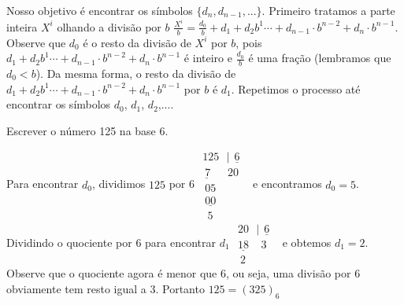 Nosso objetivo é encontrar os símbolos $\{d_n, d_{n-1}, ...\}$. Primeiro tratamos a parte inteira $X^{i}$ olhando a divisão por $b$
$
\frac{X^{i}}{b}=   \frac{d_0}{b}+d_1+d_2 b^1\cdots+d_{n-1}\cdot b^{n-2} +d_n\cdot b^{n-1}.
$
Observe que $d_0$ é o resto da divisão de $X^i$ por $b$, pois $d_1+d_2 b^1\cdots+d_{n-1}\cdot b^{n-2} +d_n\cdot b^{n-1}$ é inteiro e $\frac{d_0}{b}$ é uma fração (lembramos que $d_0<b$). Da mesma forma, o resto da divisão de $d_1+d_2 b^1\cdots+d_{n-1}\cdot b^{n-2} +d_n\cdot b^{n-1}$ por $b$ é $d_1$. Repetimos o processo até encontrar os símbolos $d_0$, $d_1$, $d_2$,....
\begin{ex}Escrever o número 125 na base $6$.

Para encontrar $d_0$, dividimos $125$ por 6
$
\begin{array}{l}
125 \ \ \ |\! \underline{\ \ 6\ \ } \\
\underline{\ 7 }\ \ \ \ \ \ \ 20\\
\ 05\\
\ \underline{00}\\
\ \ 5
\end{array}
$
e encontramos $d_0=5$. Dividindo o quociente por $6$ para encontrar $d_1$
$
\begin{array}{l}
20 \ \ \ |\! \underline{\ \ 6\ \ } \\
\underline{18 }\ \ \ \ \ 3\\
\ 2
\end{array}
$
e obtemos $d_1=2$. Observe que o quociente agora é menor que $6$, ou seja, uma divisão por $6$ obviamente tem resto igual a $3$. Portanto
$
125=(325)_6
$
\end{ex}


